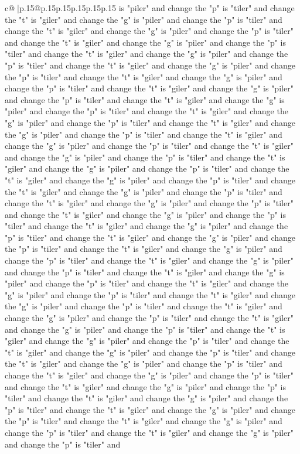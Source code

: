 \documentclass{article}
\begin{document}
{\begin{supertabular}{c@{$\;$}|p{.15\linewidth}@{}p{.15\linewidth}p{.15\linewidth}p{.15\linewidth}p{.15\linewidth}p{.15\linewidth}}
{{{is "piler" and change the "p" is "tiler" and change the "t" is "giler" and change the "g" is "piler" and change the "p" is "tiler" and change the "t" is "giler" and change the "g" is "piler" and change the "p" is "tiler" and change the "t" is "giler" and change the "g" is "piler" and change the "p" is "tiler" and change the "t" is "giler" and change the "g" is "piler" and change the "p" is "tiler" and change the "t" is "giler" and change the "g" is "piler" and change the "p" is "tiler" and change the "t" is "giler" and change the "g" is "piler" and change the "p" is "tiler" and change the "t" is "giler" and change the "g" is "piler" and change the "p" is "tiler" and change the "t" is "giler" and change the "g" is "piler" and change the "p" is "tiler" and change the "t" is "giler" and change the "g" is "piler" and change the "p" is "tiler" and change the "t" is "giler" and change the "g" is "piler" and change the "p" is "tiler" and change the "t" is "giler" and change the "g" is "piler" and change the "p" is "tiler" and change the "t" is "giler" and change the "g" is "piler" and change the "p" is "tiler" and change the "t" is "giler" and change the "g" is "piler" and change the "p" is "tiler" and change the "t" is "giler" and change the "g" is "piler" and change the "p" is "tiler" and change the "t" is "giler" and change the "g" is "piler" and change the "p" is "tiler" and change the "t" is "giler" and change the "g" is "piler" and change the "p" is "tiler" and change the "t" is "giler" and change the "g" is "piler" and change the "p" is "tiler" and change the "t" is "giler" and change the "g" is "piler" and change the "p" is "tiler" and change the "t" is "giler" and change the "g" is "piler" and change the "p" is "tiler" and change the "t" is "giler" and change the "g" is "piler" and change the "p" is "tiler" and change the "t" is "giler" and change the "g" is "piler" and change the "p" is "tiler" and change the "t" is "giler" and change the "g" is "piler" and change the "p" is "tiler" and change the "t" is "giler" and change the "g" is "piler" and change the "p" is "tiler" and change the "t" is "giler" and change the "g" is "piler" and change the "p" is "tiler" and change the "t" is "giler" and change the "g" is "piler" and change the "p" is "tiler" and change the "t" is "giler" and change the "g" is "piler" and change the "p" is "tiler" and change the "t" is "giler" and change the "g" is "piler" and change the "p" is "tiler" and change the "t" is "giler" and change the "g" is "piler" and change the "p" is "tiler" and change the "t" is "giler" and change the "g" is "piler" and change the "p" is "tiler" and change the "t" is "giler" and change the "g" is "piler" and change the "p" is "tiler" and change the "t" is "giler" and change the "g" is "piler" and change the "p" is "tiler" and change the "t" is "giler" and change the "g" is "piler" and change the "p" is "tiler" and change the "t" is "giler" and change the "g" is "piler" and change the "p" is "tiler" and change the "t" is "giler" and change the "g" is "piler" and change the "p" is "tiler" and change the "t" is "giler" and change the "g" is "piler" and change the "p" is "tiler" and }}}
\end{supertabular}}
\end{document}
